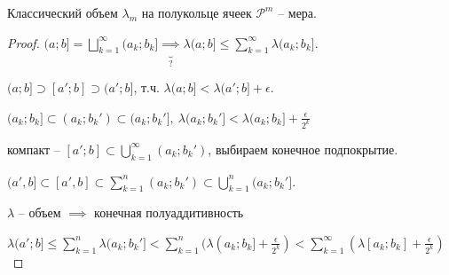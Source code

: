 
\begin{theorem}
    Классический объем $\lambda_m$ на полукольце ячеек $\mathcal{P}^m$ -- мера.
\end{theorem}

\begin{proof}
    $(a; b] = \bigsqcup_{k=1}^{\infty} (a_k; b_k] \underbrace{\implies}_{?} \lambda (a; b] \leq \sum_{k=1}^{\infty} \lambda (a_k; b_k]$.

    $(a; b] \supset [a'; b] \supset (a'; b]$, т.ч. $\lambda (a; b] < \lambda(a'; b] + \epsilon$.

    $(a_k; b_k] \subset (a_k; b_k') \subset (a_k; b_k'], \ \lambda (a_k; b_k'] < \lambda (a_k; b_k] + \frac{\epsilon}{2^k}$

    компакт -- $[a'; b] \subset \bigcup_{k=1}^{\infty} (a_k; b_k')$, выбираем конечное подпокрытие.


    $(a', b] \subset [a', b] \subset \sum_{k=1}^{n} (a_k; b_k') \subset \bigcup_{k=1}^{n} (a_k; b_k']$.

    $\lambda$ -- объем $\implies$ конечная полуаддитивность
    
    $\lambda (a'; b] \leq \sum_{k=1}^{n} \lambda (a_k; b_k'] < \sum_{k=1}^{n} (\lambda (a_k; b_k] + \frac{\epsilon}{2^k}) < \sum_{k=1}^{\infty} (\lambda [a_k; b_k] + \frac{\epsilon}{2^k})$

\end{proof}